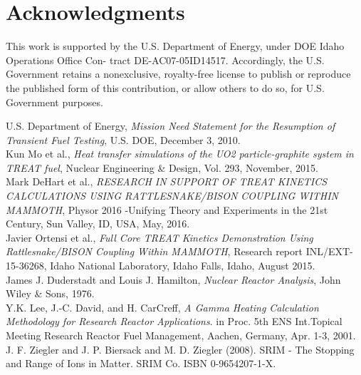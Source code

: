 \documentclass{anstrans}
\begin{document}
\section{Acknowledgments}
This work is supported by the U.S. Department of Energy, under DOE Idaho Operations Office Con- tract DE-AC07-05ID14517. Accordingly, the U.S. Government retains a nonexclusive, royalty-free license to publish or reproduce the published form of this contribution, or allow others to do so, for U.S. Government purposes.

\begin{thebibliography}{1}

 U.S. Department of Energy, {\em Mission Need Statement for the Resumption of Transient Fuel Testing}, U.S. DOE, December 3, 2010. \\

 Kun Mo et al., {\em Heat transfer simulations of the UO2 particle-graphite system in TREAT fuel}, Nuclear Engineering \& Design, Vol. 293, November, 2015. \\

 Mark DeHart et al., {\em RESEARCH IN SUPPORT OF TREAT KINETICS CALCULATIONS USING RATTLESNAKE/BISON COUPLING WITHIN MAMMOTH}, Physor 2016 -Unifying Theory and Experiments in the 21st Century, Sun Valley, ID, USA, May, 2016. \\

 Javier Ortensi et al.,  {\em Full Core TREAT Kinetics Demonstration Using Rattlesnake/BISON Coupling Within MAMMOTH}, Research report INL/EXT-15-36268, Idaho National Laboratory, Idaho Falls, Idaho, August 2015.\\

 James J. Duderstadt and Louis J. Hamilton, {\em Nuclear Reactor Analysis}, John Wiley \& Sons, 1976.\\

 Y.K. Lee, J.-C. David, and H. CarCreff, {\em A Gamma Heating Calculation Methodology for Research Reactor Applications}. in Proc. 5th ENS Int.Topical Meeting Research Reactor Fuel Management, Aachen, Germany, Apr. 1-3, 2001.\\

 J. F. Ziegler and J. P. Biersack and M. D. Ziegler (2008). SRIM - The Stopping and Range of Ions in Matter. SRIM Co. ISBN 0-9654207-1-X.\\


\end{thebibliography}
\end{document}
